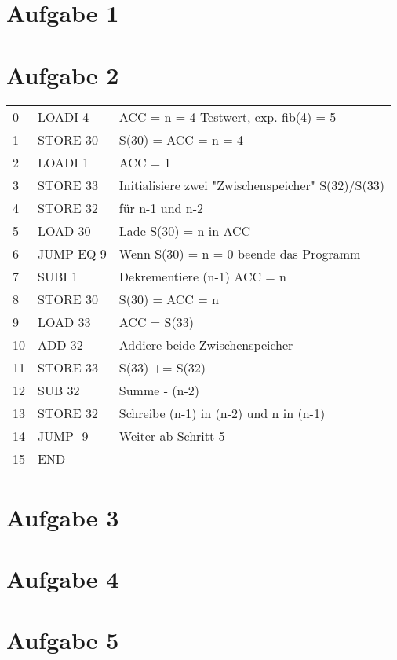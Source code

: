 \documentclass[a4paper,
twoside, %
headlines=2.1 %
]{scrartcl}
\author{\yourname}
\title{\lecture}
\subtitle{Übungsblatt \sheetnum}
\date{} %
\begin{document}
	
	\maketitle
	
	\section*{Aufgabe 1}
	
	\section*{Aufgabe 2}
	
	\begin{tabular}{l l|l}
		0 & LOADI 4	& ACC = n = 4 Testwert, exp. fib(4) = 5 \\
		1 & STORE 30& S(30) = ACC = n = 4 \\
		
		2 & LOADI 1	& ACC = 1\\
		3 & STORE 33 & Initialisiere zwei "Zwischenspeicher" S(32)/S(33)\\
		4 & STORE 32 & für n-1 und n-2\\
		5 & LOAD 30	& Lade S(30) = n in ACC\\
		6 & JUMP EQ 9 & Wenn S(30) = n = 0 beende das Programm\\
		7 & SUBI 1 & Dekrementiere (n-1) ACC = n\\
		8 & STORE 30 & S(30) = ACC = n\\
		9 & LOAD 33	& ACC = S(33)\\
		10 & ADD 32 & Addiere beide Zwischenspeicher\\
		11 & STORE 33 & S(33) += S(32)\\
		12 & SUB 32 & Summe - (n-2)\\
		13 & STORE 32 & Schreibe (n-1) in (n-2) und n in (n-1)\\
		14 & JUMP -9 & Weiter ab Schritt 5\\
		15 & END &
	\end{tabular}
	
	\section*{Aufgabe 3}
	
	\section*{Aufgabe 4}
	
	\section*{Aufgabe 5}
	
\end{document}
